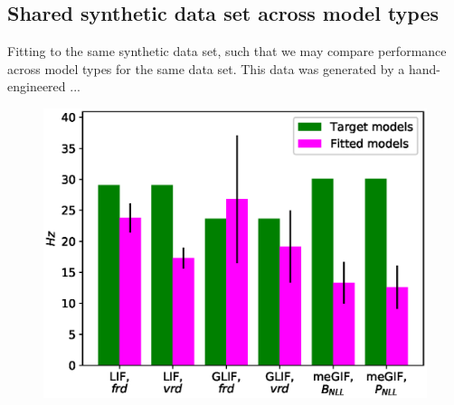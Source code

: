 
\subsection{Shared synthetic data set across model types}
Fitting to the same synthetic data set, such that we may compare performance across model types for the same data set. 
This data was generated by a hand-engineered ...

\begin{figure}
    \centering
	\includegraphics[width=0.49\columnwidth]{figures/export_rates_only_GT_all.eps}
\end{figure}







